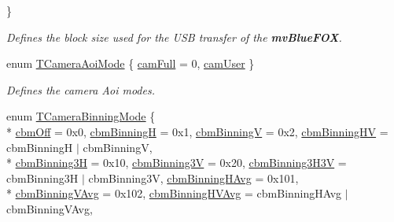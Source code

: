 \begin{DoxyCompactItemize}
 \}
\begin{DoxyCompactList}\small\item\em Defines the block size used for the U\+S\+B transfer of the {\bfseries mv\+Blue\+F\+O\+X}. \end{DoxyCompactList}\item 
enum \hyperlink{group___device_specific_interface_gaab13c0272df6eebe71ee4b8f45796cd3}{T\+Camera\+Aoi\+Mode} \{ \hyperlink{group___device_specific_interface_ggaab13c0272df6eebe71ee4b8f45796cd3a83bae4f63a78a137a81e13558624c02d}{cam\+Full} = 0, 
\hyperlink{group___device_specific_interface_ggaab13c0272df6eebe71ee4b8f45796cd3a4801924ec81e812e0ddf9d7bd6ef12e9}{cam\+User}
 \}
\begin{DoxyCompactList}\small\item\em Defines the camera Aoi modes. \end{DoxyCompactList}\item 
enum \hyperlink{group___device_specific_interface_ga915d7e18807e69567ac466541b66313b}{T\+Camera\+Binning\+Mode} \{ \\*
\hyperlink{group___device_specific_interface_gga915d7e18807e69567ac466541b66313ba4cd8cbdad824509f49e8cc32f44f6abd}{cbm\+Off} = 0x0, 
\hyperlink{group___device_specific_interface_gga915d7e18807e69567ac466541b66313baa9ed6a2ad421b2db101bc8b444a2256a}{cbm\+Binning\+H} = 0x1, 
\hyperlink{group___device_specific_interface_gga915d7e18807e69567ac466541b66313bac96a80f5ccdc944a0dca259769c28240}{cbm\+Binning\+V} = 0x2, 
\hyperlink{group___device_specific_interface_gga915d7e18807e69567ac466541b66313baf81c469c51f9461fa54383d94f70b6c9}{cbm\+Binning\+H\+V} = cbm\+Binning\+H $\vert$ cbm\+Binning\+V, 
\\*
\hyperlink{group___device_specific_interface_gga915d7e18807e69567ac466541b66313baead6a44b146baed892837a57f7991b31}{cbm\+Binning3\+H} = 0x10, 
\hyperlink{group___device_specific_interface_gga915d7e18807e69567ac466541b66313ba0e8e450605dff407fd6c787c02098254}{cbm\+Binning3\+V} = 0x20, 
\hyperlink{group___device_specific_interface_gga915d7e18807e69567ac466541b66313babdafa41cec0d848f26b686e3fa67eb77}{cbm\+Binning3\+H3\+V} = cbm\+Binning3\+H $\vert$ cbm\+Binning3\+V, 
\hyperlink{group___device_specific_interface_gga915d7e18807e69567ac466541b66313ba26c74f23187e599f011da6d7dce336f7}{cbm\+Binning\+H\+Avg} = 0x101, 
\\*
\hyperlink{group___device_specific_interface_gga915d7e18807e69567ac466541b66313badc13af3d2763fe81efd3fcb7e9359b88}{cbm\+Binning\+V\+Avg} = 0x102, 
\hyperlink{group___device_specific_interface_gga915d7e18807e69567ac466541b66313ba5f93249b42313ba2eb6a5b9e144a2664}{cbm\+Binning\+H\+V\+Avg} = cbm\+Binning\+H\+Avg $\vert$ cbm\+Binning\+V\+Avg, 

\end{DoxyCompactItemize}
